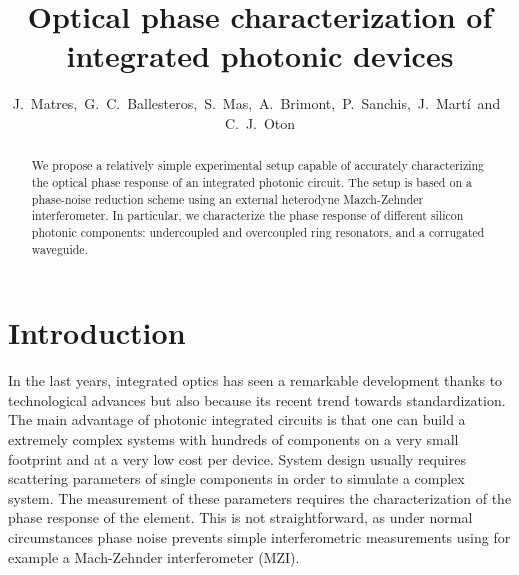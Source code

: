 \documentclass[journal]{IEEEtran}
\begin{document}
\title{Optical phase characterization of integrated photonic devices}
\author{J.~Matres,~G.~C.~Ballesteros,~S.~Mas,~A.~Brimont,~P.~Sanchis,~J.~Mart\'i~and~C.~J.~Oton}

\maketitle


\begin{abstract}
We propose a relatively simple experimental setup capable of accurately characterizing the optical phase response of an integrated photonic circuit. The setup is based on a phase-noise reduction scheme using an external heterodyne Mazch-Zehnder interferometer. In particular, we characterize the phase response of different silicon photonic components: undercoupled and overcoupled ring resonators, and a corrugated  waveguide.

\end{abstract}

\section{Introduction}
\noindent In the last years, integrated optics has seen a remarkable development thanks to technological advances but also because its recent trend towards standardization.
The main advantage of photonic integrated circuits is that one can build a extremely complex systems with hundreds of components on a very small footprint and at a very low cost per device.
System design usually requires scattering parameters of single components in order to simulate a complex system.
The measurement of these parameters requires the characterization of the phase response of the element.
This is not straightforward, as under normal circumstances phase noise prevents simple interferometric measurements using for example a Mach-Zehnder interferometer (MZI).
\end{document}
